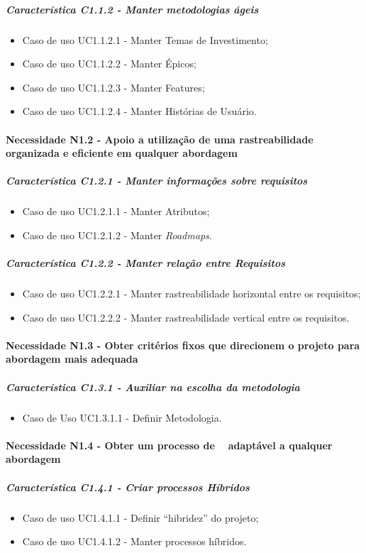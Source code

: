 	\subparagraph{Característica C1.1.2 - Manter metodologias ágeis}
		\begin{itemize}
			\item Caso de uso UC1.1.2.1 - Manter Temas de Investimento;
			\item Caso de uso UC1.1.2.2 - Manter Épicos;
			\item Caso de uso UC1.1.2.3 - Manter Features;
			\item Caso de uso UC1.1.2.4 - Manter Histórias de Usuário.
		\end{itemize}

\paragraph{Necessidade N1.2 - Apoio a utilização de uma rastreabilidade organizada e eficiente em qualquer abordagem}
	\subparagraph{Característica C1.2.1 - Manter informações sobre requisitos}
		\begin{itemize}
			\item Caso de uso UC1.2.1.1 - Manter Atributos;
			\item Caso de uso UC1.2.1.2 - Manter \textit{Roadmaps}.
		\end{itemize}

	\subparagraph{Característica C1.2.2 - Manter relação entre Requisitos}
		\begin{itemize}
			\item Caso de uso UC1.2.2.1 - Manter rastreabilidade horizontal entre os requisitos;
			\item Caso de uso UC1.2.2.2 - Manter rastreabilidade vertical entre os requisitos.
		\end{itemize}

\paragraph{Necessidade N1.3 - Obter critérios fixos que direcionem o projeto para abordagem mais adequada}
	\subparagraph{Característica C1.3.1 - Auxiliar na escolha da metodologia}
		\begin{itemize}
			\item Caso de Uso UC1.3.1.1 - Definir Metodologia.
		\end{itemize}

\paragraph{Necessidade N1.4 - Obter um processo de \er~ adaptável a qualquer abordagem}
	\subparagraph{Característica C1.4.1 - Criar processos Híbridos}
	\begin{itemize}
		\item Caso de uso UC1.4.1.1 - Definir ``hibridez'' do projeto;
		\item Caso de uso UC1.4.1.2 - Manter processos híbridos.
	\end{itemize}

